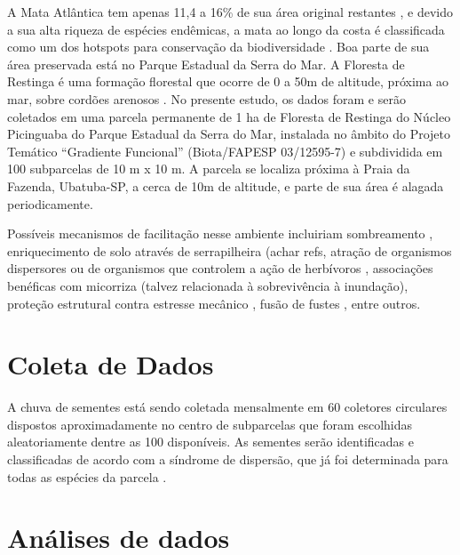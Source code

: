 \documentclass[twoside,12pt,a4paper]{report}
\begin{document}
A Mata Atlântica tem apenas 11,4 a 16\% de sua área original restantes \citep{Ribeiro2009}, e
devido a sua alta riqueza de espécies endêmicas, a mata ao longo da costa é classificada como um dos
hotspots para conservação da biodiversidade \citep{Myers2000}. Boa parte de sua área preservada
está no Parque Estadual da Serra do Mar. A Floresta de Restinga é uma formação florestal que ocorre
de 0 a 50m de altitude, próxima ao mar, sobre cordões arenosos \citep{Joly2008}. No presente
estudo, os dados foram e serão coletados em uma parcela permanente de 1 ha de Floresta de Restinga
do Núcleo Picinguaba do Parque Estadual da Serra do Mar, instalada no âmbito do Projeto Temático
“Gradiente Funcional” (Biota/FAPESP 03/12595-7) e subdividida em 100 subparcelas de 10 m x 10 m. A
parcela se localiza próxima à Praia da Fazenda, Ubatuba-SP, a cerca de 10m de altitude, e parte de
sua área é alagada periodicamente.

Possíveis mecanismos de facilitação nesse ambiente incluiriam sombreamento
\citep{Castanho2014}, enriquecimento de solo através de serrapilheira (achar refs, atração de
organismos dispersores \citep{achar refs CallawayBook} ou de organismos que controlem a ação de
herbívoros \citep{refs}, associações benéficas com micorriza \citep{Simard1997} (talvez
relacionada à sobrevivência à inundação\citep{Fougnies2007}), proteção
estrutural contra estresse mecânico \citep{refs}, fusão de fustes \citep{McIntire2011}, entre
outros.

\section{Coleta de Dados}

A chuva de sementes está sendo coletada mensalmente em 60 coletores circulares dispostos
aproximadamente no centro de subparcelas que foram escolhidas aleatoriamente dentre as 100
disponíveis. As sementes serão identificadas e classificadas de acordo com a síndrome de
dispersão, que já foi determinada para todas as espécies da parcela \citep{martins2014}.

\section{Análises de dados}
\end{document}
